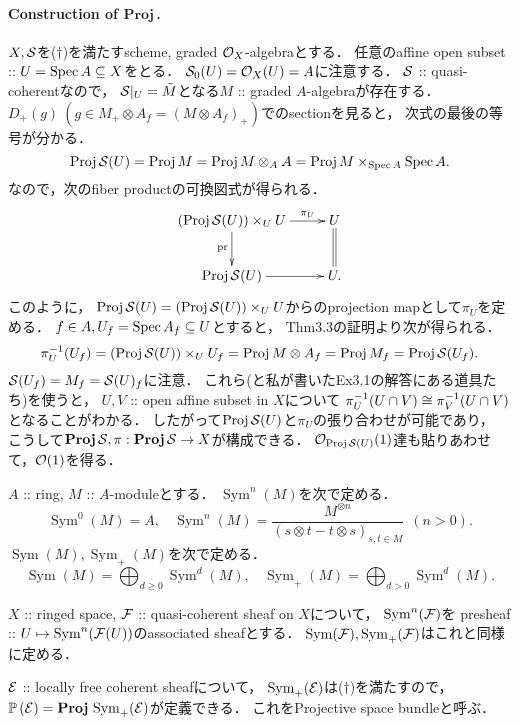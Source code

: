 \documentclass[a4paper]{jsarticle}
\newcommand{\gProj}{\mathbf{Proj}\,}
\newcommand{\Sym}{\operatorname{Sym}}
\newcommand{\pbundle}{\mathbb{P}\,}
\begin{document}
    \paragraph{Construction of $\gProj$.}
    $X, \mathcal{S}$を($\dagger$)を満たすscheme, graded $\mathcal{O}_X$-algebraとする．
    任意のaffine open subset :: $U=\operatorname{Spec} A \subseteq X$をとる．
    $\mathcal{S}_0(U)=\mathcal{O}_X(U)=A$に注意する．
    $\mathcal{S}$ :: quasi-coherentなので，
    $\mathcal{S}|_U=\tilde{M}$となる$M$ :: graded $A$-algebraが存在する．
    $D_+(g) ~(g \in M_+ \otimes A_f=(M \otimes A_f)_+)$でのsectionを見ると，
    次式の最後の等号が分かる．
    \[ \operatorname{Proj} \mathcal{S}(U)=\operatorname{Proj} M=\operatorname{Proj} M \otimes_A A=\operatorname{Proj} M \times_{\operatorname{Spec} A} \operatorname{Spec} A. \]
    なので，次のfiber productの可換図式が得られる．
    \[
        \xymatrix
        {
            (\Proj \shS(U)) \times_U U \ar[r]^-{\pi_U} \ar[d]_-{\pr}& U \ar@{=}[d] \\
            \Proj \shS(U) \ar[r]& U.
        }
    \]
    このように，
    $\operatorname{Proj} \mathcal{S}(U)=(\operatorname{Proj} \mathcal{S}(U)) \times_U U$からのprojection mapとして$\pi_U$を定める．
    $f \in A, U_f=\operatorname{Spec} A_f \subseteq U$とすると，
    Thm3.3の証明より次が得られる．
    \[ \pi_U^{-1}(U_f)=(\operatorname{Proj} \mathcal{S}(U)) \times_U U_f=\operatorname{Proj} M \otimes A_f=\operatorname{Proj} M_f=\operatorname{Proj} \mathcal{S}(U_f). \]
    $\mathcal{S}(U_f)=M_f=\mathcal{S}(U)_f$に注意．
    これら(と私が書いたEx3.1の解答にある道具たち)を使うと，
    $U,V$ :: open affine subset in $X$について
    $\pi_U^{-1}(U \cap V) \cong \pi_V^{-1}(U \cap V)$となることがわかる．
    したがって$\operatorname{Proj} \mathcal{S}(U)$と$\pi_U$の張り合わせが可能であり，
    こうして$\gProj \shS, \pi: \gProj \shS \to X$が構成できる．
    $\mathcal{O}_{\operatorname{Proj} \mathcal{S}(U)}(1)$達も貼りあわせて，$\mathcal{O}(1)$を得る．

    \begin{Def}
        $A$ :: ring,
        $M$ :: $A$-moduleとする．
        $\Sym^n(M)$を次で定める．
        \[
            \Sym^0(M)=A,~~~~
            \Sym^n(M)=\frac{M^{\otimes n}}{(s \otimes t-t \otimes s)_{s,t \in M}} ~~(n>0).
        \]
        $\Sym(M), \Sym_+(M)$を次で定める．
        \[
            \Sym(M)=\bigoplus_{d \geq 0} \Sym^d(M),~~~~
            \Sym_+(M)=\bigoplus_{d > 0} \Sym^d(M).
        \]

        $X$ :: ringed space,
        $\mathcal{F}$ :: quasi-coherent sheaf on $X$について，
        $\Sym^n(\shF)$を
        presheaf :: $U \mapsto \Sym^n(\shF(U))$のassociated sheafとする．
        $\Sym(\shF), \Sym_+(\shF)$はこれと同様に定める．
    \end{Def}
    \begin{Def}
        $\mathcal{E}$ :: locally free coherent sheafについて，
        $\Sym_+(\shE)$は($\dagger$)を満たすので，
        $\pbundle(\shE)=\gProj \Sym_+(\shE)$が定義できる．
        これをProjective space bundleと呼ぶ．
    \end{Def}
\end{document}

